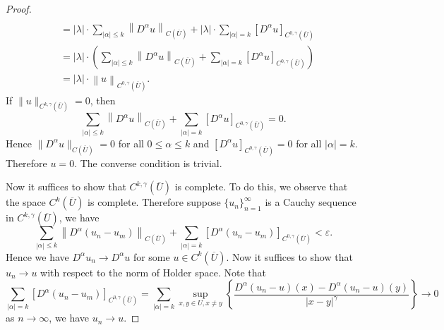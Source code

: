 \begin{proof}
$$\begin{aligned}
\\
&=\left| \lambda \right|\cdot \sum_{\left| \alpha \right|\le k}{\left\| D^{\alpha}u \right\| _{C(\overline{U})}}+\left| \lambda \right|\cdot \sum_{\left| \alpha \right|=k}{\left[ D^{\alpha}u \right] _{C^{0,\gamma}(\overline{U})}}
\\
&=\left| \lambda \right|\cdot \left( \sum_{\left| \alpha \right|\le k}{\left\| D^{\alpha}u \right\| _{C(\overline{U})}}+\sum_{\left| \alpha \right|=k}{\left[ D^{\alpha}u \right] _{C^{0,\gamma}(\overline{U})}} \right) 
\\
&=\left| \lambda \right|\cdot \left\| u \right\| _{C^{0,\gamma}(\overline{U})}.
\end{aligned}
$$
If $\|u\|_{C^{k,\gamma}(\overline{U})}=0$, then 
$$
\sum_{\left| \alpha \right|\le k}{\left\| D^{\alpha}u \right\| _{C(\overline{U})}}+\sum_{\left| \alpha \right|=k}{\left[ D^{\alpha}u \right] _{C^{0,\gamma}(\overline{U})}}=0.
$$
Hence $\|D^{\alpha}u\|_{C(\overline{U})}=0$ for all $0\le\alpha\le k$ and $[D^\alpha u]_{C^{0,\gamma}(\overline{U})}=0$ for all $|\alpha|=k$. Therefore $u=0$. The converse condition is trivial.\par
Now it suffices to show that $C^{k,\gamma}(\overline{U})$ is complete. To do this, we observe that the space $C^k(\overline{U})$ is complete. Therefore suppose $\{u_n\}_{n=1}^\infty$ is a Cauchy sequence in $C^{k,\gamma}(\overline{U})$, we have 
$$
\sum_{\left| \alpha \right|\le k}{\left\| D^{\alpha}\left( u_n-u_m \right) \right\| _{C(\overline{U})}}+\sum_{\left| \alpha \right|=k}{\left[ D^{\alpha}\left( u_n-u_m \right) \right] _{C^{0,\gamma}(\overline{U})}}<\varepsilon .
$$
Hence we have $D^\alpha u_n\to D^\alpha u$ for some $u\in C^k(\overline{U})$. Now it suffices to show that $u_n\to u$ with respect to the norm of Holder space. Note that 
$$
\sum_{\left| \alpha \right|=k}{\left[ D^{\alpha}\left( u_n-u_m \right) \right] _{C^{0,\gamma}(\overline{U})}}=\sum_{\left| \alpha \right|=k}{\mathop {\mathrm{sup}} \limits_{x,y\in U,x\ne y}\left\{ \frac{D^{\alpha}\left( u_n-u \right) \left( x \right) -D^{\alpha}\left( u_n-u \right) \left( y \right)}{\left| x-y \right|^{\gamma}} \right\}}\rightarrow 0
$$
as $n\to\infty$, we have $u_n\to u$.
\end{proof}
